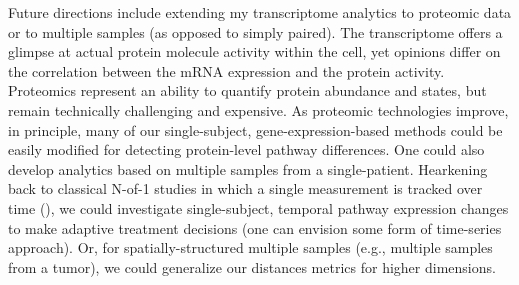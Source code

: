 %

Future directions include extending my transcriptome analytics to proteomic data or to multiple samples (as opposed to simply paired). The transcriptome offers a glimpse at actual protein molecule activity within the cell, yet opinions differ on the correlation between the mRNA expression and the protein activity. Proteomics represent an ability to quantify protein abundance and states, but remain technically challenging and expensive. As proteomic technologies improve, in principle, many of our single-subject, gene-expression-based methods could be easily modified for detecting protein-level pathway differences. One could also develop analytics based on multiple samples from a single-patient. Hearkening back to classical N-of-1 studies in which a single measurement is tracked over time (\cite{Nikles2015}), we could investigate single-subject, temporal pathway expression changes to make adaptive treatment decisions (one can envision some form of time-series approach). Or, for spatially-structured multiple samples (e.g., multiple samples from a tumor), we could generalize our distances metrics for higher dimensions.
